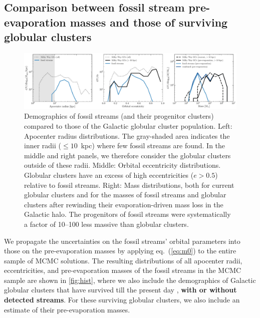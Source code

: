 \documentclass[twocolumn]{aastex63}
\newcommand{\changes}[1]{{\textbf{#1}}}
\begin{document}
\subsection{Comparison between fossil stream pre-evaporation masses and those of surviving globular clusters}
\begin{figure}
\includegraphics[width=\hsize]{distributions_mc.pdf}%
\caption{
\label{fig:hist}
Demographics of fossil streams (and their progenitor clusters) compared to those of the Galactic globular cluster population. Left: Apocenter radius distributions. The gray-shaded area indicates the inner radii ($\leq10$~kpc) where few fossil streams are found. In the middle and right panels, we therefore consider the globular clusters outside of these radii. Middle: Orbital eccentricity distributions. Globular clusters have an excess of high eccentricities ($e>0.5$) relative to fossil streams. Right: Mass distributions, both for current globular clusters and for the masses of fossil streams and globular clusters after rewinding their evaporation-driven mass loss in the Galactic halo. The progenitors of fossil streams were systematically a factor of 10--100 less massive than globular clusters.}
\end{figure}	
We propagate the uncertainties on the fossil streams' orbital parameters into those on the pre-evaporation masses by applying eq.~(\ref{eq:m0}) to the entire sample of MCMC solutions. The resulting distributions of all apocenter radii, eccentricities, and pre-evaporation masses of the fossil streams in the MCMC sample are shown in \autoref{fig:hist}, where we also include the demographics of Galactic globular clusters that have survived till the present day \citep[2010 edition]{harris96}, \changes{with or without detected streams}. For these surviving globular clusters, we also include an estimate of their pre-evaporation masses.
\end{document}
